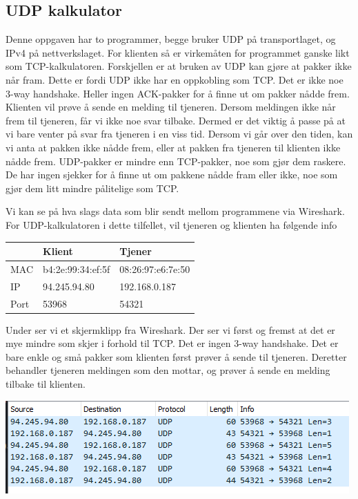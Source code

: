 \documentclass[12pt]{article}
\begin{document}
    \subsection{UDP kalkulator}
    Denne oppgaven har to programmer, begge bruker UDP på transportlaget, og IPv4 på nettverkslaget.
    For klienten så er virkemåten for programmet ganske likt som TCP-kalkulatoren. Forskjellen er at 
    bruken av UDP kan gjøre at pakker ikke når fram. Dette er fordi UDP ikke har en oppkobling som 
    TCP. Det er ikke noe 3-way handshake. Heller ingen ACK-pakker for å finne ut om pakker nådde frem.
    Klienten vil prøve å sende en melding til tjeneren. Dersom 
    meldingen ikke når frem til tjeneren, får vi ikke noe svar tilbake. Dermed er det viktig å passe på 
    at vi bare venter på svar fra tjeneren i en viss tid. Dersom vi går over den tiden, kan 
    vi anta at pakken ikke nådde frem, eller at pakken fra tjeneren til klienten ikke nådde frem. 
    UDP-pakker er mindre enn TCP-pakker, noe som gjør dem raskere. De har ingen sjekker for å finne 
    ut om pakkene nådde fram eller ikke, noe som gjør dem litt mindre pålitelige som TCP.

    Vi kan se på hva slags data som blir sendt mellom programmene via Wireshark.
    For UDP-kalkulatoren i dette tilfellet, vil tjeneren og klienten ha følgende info

    \begin{center}
        \begin{tabular}{|l|l|l|}
            \hline
                 & Klient            & Tjener            \\ \hline
            MAC  & b4:2e:99:34:ef:5f & 08:26:97:e6:7e:50 \\ \hline
            IP   & 94.245.94.80      & 192.168.0.187     \\ \hline
            Port & 53968             & 54321             \\ \hline
        \end{tabular}
    \end{center}
    
    Under ser vi et skjermklipp fra Wireshark. Der ser vi først og fremst at det er mye mindre 
    som skjer i forhold til TCP. Det er ingen 3-way handshake. Det er bare enkle og små pakker
    som klienten først prøver å sende til tjeneren. Deretter behandler tjeneren meldingen som
    den mottar, og prøver å sende en melding tilbake til klienten. 

    \begin{center}
        \includegraphics{assets/Yz1XfZv.png}
    \end{center}
\end{document}
